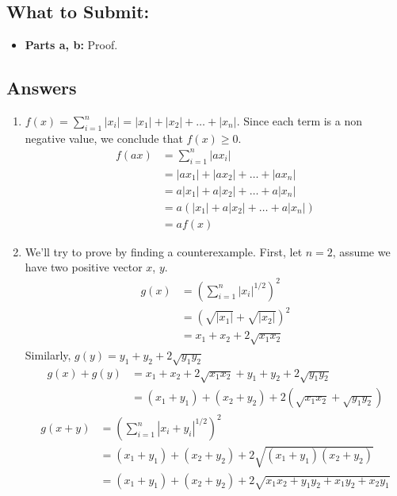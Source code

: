 \documentclass{article}
\begin{document}
\begin{sloppypar}
\begin{aprob}
    \subsection*{What to Submit:}
    \begin{itemize}
        \item \textbf{Parts a, b:} Proof.
    \end{itemize}

    \subsection*{Answers}
    \begin{enumerate}
        \item $f(x)=\sum_{i=1}^{n} |x_i| = |x_1|+|x_2|+\dots+|x_n|$. Since each term is a non negative value, we conclude that $f(x)\ge 0$.
        \begin{align*}
            f(ax) &=\sum_{i=1}^{n} |ax_i| \\
            &= |ax_1|+|ax_2|+\dots+|ax_n| \\
            &= a|x_1|+a|x_2|+\dots+a|x_n|\\
            &=a(|x_1|+a|x_2|+\dots+a|x_n|)\\
            &=af(x)
        \end{align*}
        \item We'll try to prove by finding a counterexample. First, let $n=2$, 
        assume we have two positive vector $x$, $y$.
        \begin{align*}
            g(x) &= (\sum_{i=1}^n |x_i|^{1/2})^2 \\
            &= (\sqrt{|x_1|}+\sqrt{|x_2|})^2 \\
            &= x_1 + x_2 + 2\sqrt{x_1 x_2}
        \end{align*}
        Similarly, $g(y) =  y_1 + y_2 + 2\sqrt{y_1 y_2}$
        \begin{align*}
            g(x) + g(y) &= x_1 + x_2 + 2\sqrt{x_1 x_2} + y_1 + y_2 + 2\sqrt{y_1 y_2} \\
            &= (x_1+y_1) + (x_2+y_2) + 2(\sqrt{x_1 x_2} + \sqrt{y_1 y_2})
        \end{align*}
        \begin{align*}
            g(x + y) &= (\sum_{i=1}^n |x_i+y_i|^{1/2})^2 \\
            &= (x_1+y_1) + (x_2+y_2) + 2\sqrt{(x_1+y_1) (x_2+y_2)} \\
            &= (x_1+y_1) + (x_2+y_2) + 2\sqrt{x_1 x_2 + y_1 y_2 + x_1 y_2 + x_2 y_1}

\end{align*}
\end{enumerate}
\end{aprob}
\end{sloppypar}
\end{document}
